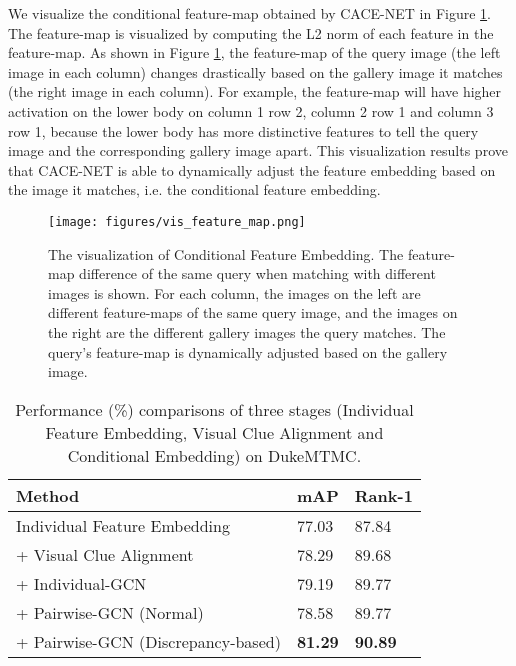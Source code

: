 \documentclass[final]{cvpr}
\begin{document}
We visualize the conditional feature-map obtained by CACE-NET in Figure \ref{fig_vis_featuremap}. The feature-map is visualized by computing the  L2 norm of each feature in the feature-map. As shown in Figure \ref{fig_vis_featuremap}, the feature-map of the query image (the left image in each column) changes drastically based on the gallery image it matches (the right image in each column). For example, the feature-map will have higher activation on the lower body on column 1 row 2, column 2 row 1 and column 3 row 1, because the lower body has more distinctive features to tell the query image and the corresponding gallery image apart. This visualization results prove that CACE-NET is able to dynamically adjust the feature embedding based on the image it matches, i.e. the conditional feature embedding. 

\begin{figure}[t]
\centering
\texttt{[image: figures/vis\_feature\_map.png]} \caption{The visualization of Conditional Feature Embedding. The feature-map difference of the same query when matching with different images is shown. For each column, the images on the left are different feature-maps of the same query image, and the images on the right are the different gallery images the query matches. The query's feature-map is dynamically adjusted based on the gallery image.  }
\label{fig_vis_featuremap}
\end{figure}


\begin{table}[!t]
\centering
\footnotesize
\caption{Performance (\%) comparisons of three stages (Individual Feature Embedding, Visual Clue Alignment and Conditional Embedding) on DukeMTMC.} 
\label{table_stage}
\begin{tabular}{lll}
\hline
Method & mAP & Rank-1 \\
\hline
Individual Feature Embedding & 77.03 & 87.84\\
 + Visual Clue Alignment & 78.29 & 89.68  \ \\
 + Individual-GCN & 79.19 & 89.77  \\
 + Pairwise-GCN (Normal) & 78.58  & 89.77 \\
 + Pairwise-GCN (Discrepancy-based) & \textbf{81.29} & \textbf{90.89} \\
\hline
\end{tabular}
\end{table}
\end{document}
